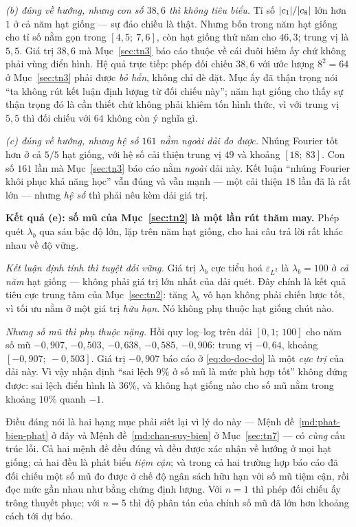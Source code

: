 \emph{(b) đúng về hướng, nhưng con số $38{,}6$ thì không tiêu biểu.} Tỉ số
$\lvert c_1\rvert/\lvert c_8\rvert$ lớn hơn $1$ ở cả năm hạt giống --- sự đảo chiều là thật.
Nhưng bốn trong năm hạt giống cho tỉ số nằm gọn trong $[4{,}5;\ 7{,}6]$, còn hạt
giống thứ năm cho $46{,}3$; trung vị là $5{,}5$. Giá trị $38{,}6$ mà
Mục~\ref{sec:tn3} báo cáo thuộc về cái đuôi hiếm ấy chứ không phải vùng điển
hình. Hệ quả trực tiếp: phép đối chiếu $38{,}6$ với ước lượng $8^2 = 64$ ở
Mục~\ref{sec:tn3} phải được \emph{bỏ hẳn}, không chỉ dè dặt. Mục ấy đã thận
trọng nói ``ta không rút kết luận định lượng từ đối chiếu này''; năm hạt giống
cho thấy sự thận trọng đó là cần thiết chứ không phải khiêm tốn hình thức, vì
với trung vị $5{,}5$ thì đối chiếu với $64$ không còn ý nghĩa gì.

\emph{(c) đúng về hướng, nhưng hệ số $161$ nằm ngoài dải đo được.} Nhúng Fourier
tốt hơn ở cả $5/5$ hạt giống, với hệ số cải thiện trung vị $49$ và khoảng
$[18;\ 83]$. Con số $161$ lần mà Mục~\ref{sec:tn3} báo cáo nằm \emph{ngoài} dải
này. Kết luận ``nhúng Fourier khôi phục khả năng học'' vẫn đúng và vẫn mạnh ---
một cải thiện $18$ lần đã là rất lớn --- nhưng \emph{hệ số} thì phải nêu kèm dải
giá trị.

\textbf{Kết quả (e): số mũ của Mục~\ref{sec:tn2} là một lần rút thăm may.} Phép
quét $\lambda_b$ qua sáu bậc độ lớn, lặp trên năm hạt giống, cho hai câu trả lời
rất khác nhau về độ vững.

\emph{Kết luận định tính thì tuyệt đối vững.} Giá trị $\lambda_b$ cực tiểu hoá
$\varepsilon_{L^2}$ là $\lambda_b = 100$ ở \emph{cả năm} hạt giống --- không
phải giá trị lớn nhất của dải quét. Đây chính là kết quả tiêu cực trung tâm của
Mục~\ref{sec:tn2}: tăng $\lambda_b$ vô hạn không phải chiến lược tốt, vì tối ưu
nằm ở một giá trị \emph{hữu hạn}. Nó không phụ thuộc hạt giống chút nào.

\emph{Nhưng số mũ thì phụ thuộc nặng.} Hồi quy log--log trên dải
$[0{,}1;\ 100]$ cho năm số mũ $-0{,}907$, $-0{,}503$, $-0{,}638$, $-0{,}585$,
$-0{,}906$: trung vị $-0{,}64$, khoảng $[-0{,}907;\ -0{,}503]$. Giá trị
$-0{,}907$ báo cáo ở \eqref{eq:do-doc-do} là một \emph{cực trị} của dải này. Vì
vậy nhận định ``sai lệch $9\%$ ở số mũ là mức phù hợp tốt'' không đứng được:
sai lệch điển hình là $36\%$, và không hạt giống nào cho số mũ nằm trong khoảng
$10\%$ quanh $-1$.

Điều đáng nói là hai hạng mục phải siết lại vì lý do này ---
Mệnh đề~\ref{md:phat-bien-phat} ở đây và Mệnh đề~\ref{md:chan-suy-bien} ở
Mục~\ref{sec:tn7} --- có \emph{cùng} cấu trúc lỗi. Cả hai mệnh đề đều đúng và
đều được xác nhận về hướng ở mọi hạt giống; cả hai đều là phát biểu
\emph{tiệm cận}; và trong cả hai trường hợp báo cáo đã đối chiếu một số mũ đo
được ở chế độ ngân sách hữu hạn với số mũ tiệm cận, rồi đọc mức gần nhau như
bằng chứng định lượng. Với $n = 1$ thì phép đối chiếu ấy trông thuyết phục; với
$n = 5$ thì độ phân tán của chính số mũ đã lớn hơn khoảng cách tới dự báo.

